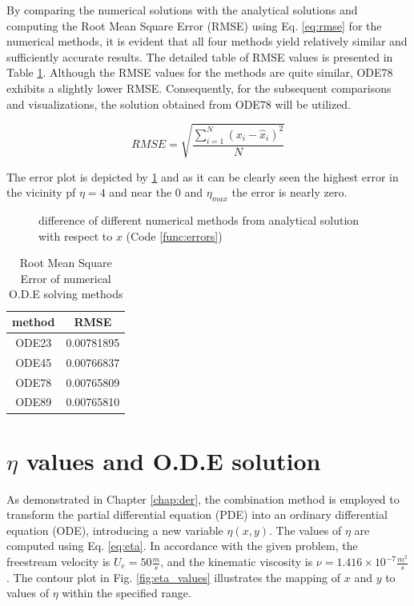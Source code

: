 \documentclass[]{report}
\begin{document}
By comparing the numerical solutions with the analytical solutions and computing the Root Mean Square Error (RMSE) using Eq. \ref{eq:rmse} for the numerical methods, it is evident that all four methods yield relatively similar and sufficiently accurate results. The detailed table of RMSE values is presented in Table \ref{tab:rmse}. Although the RMSE values for the methods are quite similar, ODE78 exhibits a slightly lower RMSE. Consequently, for the subsequent comparisons and visualizations, the solution obtained from ODE78 will be utilized.


\begin{equation}
\label{eq:rmse}
    RMSE = \sqrt{\frac{\sum_{i=1}^{N}(x_i - \hat{x}_i)^2}{N}}
\end{equation}

The error plot is depicted by \ref{fig:error_values} and as it can be clearly seen the highest error in the vicinity pf $\eta=4$ and near the $0$ and $\eta_{max}$ the error is nearly zero.
 
\begin{figure}
    \centering
    
    \caption{difference of different numerical methods from analytical solution with respect to $x$ (Code \ref{func:errors})}
    \label{fig:error_values}
\end{figure}

\begin{table}[h]
\centering
\caption{Root Mean Square Error of numerical O.D.E solving methods}
\label{tab:rmse}
\begin{tabular}{|c|c|}
\hline
method & RMSE       \\ \hline
ODE23  & 0.00781895 \\ \hline
ODE45  & 0.00766837 \\ \hline
ODE78  & 0.00765809 \\ \hline
ODE89  & 0.00765810 \\ \hline
\end{tabular}
\end{table}

\section{$\eta$ values and O.D.E solution}


As demonstrated in Chapter \ref{chap:der}, the combination method is employed to transform the partial differential equation (PDE) into an ordinary differential equation (ODE), introducing a new variable $\eta(x,y)$. The values of $\eta$ are computed using Eq. \ref{eq:eta}. In accordance with the given problem, the freestream velocity is $U_e = 50 \frac{m}{s}$, and the kinematic viscosity is $\nu = 1.416 \times 10^{-7} \frac{m^2}{s}$. The contour plot in Fig. \ref{fig:eta_values} illustrates the mapping of $x$ and $y$ to values of $\eta$ within the specified range.
\end{document}
